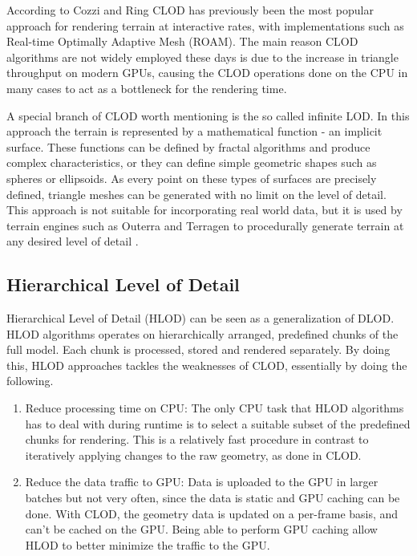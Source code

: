 According to Cozzi and Ring \cite[p. 368]{cozzi11} CLOD has previously been the most popular approach for rendering terrain at interactive rates, with implementations such as Real-time Optimally Adaptive Mesh (ROAM). The main reason CLOD algorithms are not widely employed these days is due to the increase in triangle throughput on modern GPUs, causing the CLOD operations done on the CPU in many cases to act as a bottleneck for the rendering time.

A special branch of CLOD worth mentioning is the so called infinite LOD. In this approach the terrain is represented by a mathematical function - an implicit surface. These functions can be defined by fractal algorithms and produce complex characteristics, or they can define simple geometric shapes such as spheres or ellipsoids. As every point on these types of surfaces are precisely defined, triangle meshes can be generated with no limit on the level of detail. This approach is not suitable for incorporating real world data, but it is used by terrain engines such as Outerra and Terragen to procedurally generate terrain at any desired level of detail \cite{outerraprocedural09}. 

\subsection{Hierarchical Level of Detail}
Hierarchical Level of Detail (HLOD) can be seen as a generalization of DLOD. HLOD algorithms operates on hierarchically arranged, predefined chunks of the full model. Each chunk is processed, stored and rendered separately. By doing this, HLOD approaches tackles the weaknesses of CLOD, essentially by doing the following.

\begin{enumerate}
    \item Reduce processing time on CPU: The only CPU task that HLOD algorithms has to deal with during runtime is to select a suitable subset of the predefined chunks for rendering. This is a relatively fast procedure in contrast to iteratively applying changes to the raw geometry, as done in CLOD.
    \item Reduce the data traffic to GPU: Data is uploaded to the GPU in larger batches but not very often, since the data is static and GPU caching can be done. With CLOD, the geometry data is updated on a per-frame basis, and can't be cached on the GPU. Being able to perform GPU caching allow HLOD to better minimize the traffic to the GPU.
\end{enumerate}

